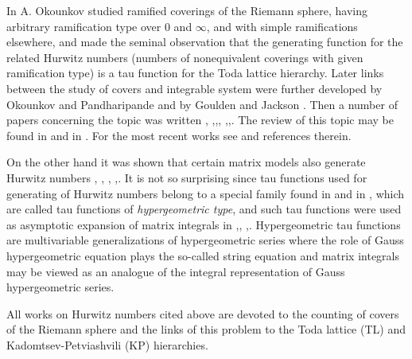 \documentclass[a4paper,10pt]{article}
\theoremstyle{plain}
\theoremstyle{remark}
\begin{document}
In  \cite{Okounkov-2000} A. Okounkov studied
ramified coverings of the Riemann sphere, having arbitrary ramification
type over $0$ and $\infty$, and with simple ramifications elsewhere, and  made the
seminal observation that the
generating function for the related Hurwitz numbers (numbers of nonequivalent coverings with
given ramification type) is a tau function for the Toda lattice hierarchy. Later  links
between the study of covers and integrable system were further developed by Okounkov and Pandharipande
\cite{Okounkov-Pand-2006} and by Goulden and Jackson \cite{Goulden-Jackson-2008}.
Then a number of papers concerning the topic was written \cite{MM1},
\cite{ AMMN-2011, AMMN-2014},\cite{DuninKazarian---2013},\cite{Zog},
\cite{Harnad-2014},\cite{HO-2014},\cite{Harnad-October-2014}.
The review of this topic may be found in \cite{Uspehi-KazarianLando} and in \cite{Harnad-overview-2015}.
For the most recent works see \cite{ACEH-2016-11} and references therein.

On the other hand it was shown that certain matrix models also generate
Hurwitz numbers \cite{Zog}, \cite{GGPN}, \cite{KZ}, \cite{HarnadMathieu-sept-2014},\cite{Chekhov-2014}.
It is not so surprising since tau functions used for generating of Hurwitz numbers belong to a special family 
 found in \cite{KMMM} and in \cite{OS-2000},\cite{OS-TMP} which are called tau functions of
\textit{hypergeometric type},
and such tau functions were used as asymptotic expansion of matrix integrals in \cite{HO-Borel},\cite{O-2002},
\cite{OShiota-2004},\cite{HO-2MM}. Hypergeometric tau functions are multivariable generalizations of hypergeometric
series where the role of Gauss hypergeometric equation plays the so-called string equation \cite{OS-2000} and
matrix integrals may be viewed as an analogue of the integral representation of Gauss hypergeometric series.


All works on Hurwitz numbers cited above are devoted to the counting of covers of the Riemann sphere and
the links of this problem to the Toda lattice (TL) and Kadomtsev-Petviashvili (KP) hierarchies.
\end{document}
